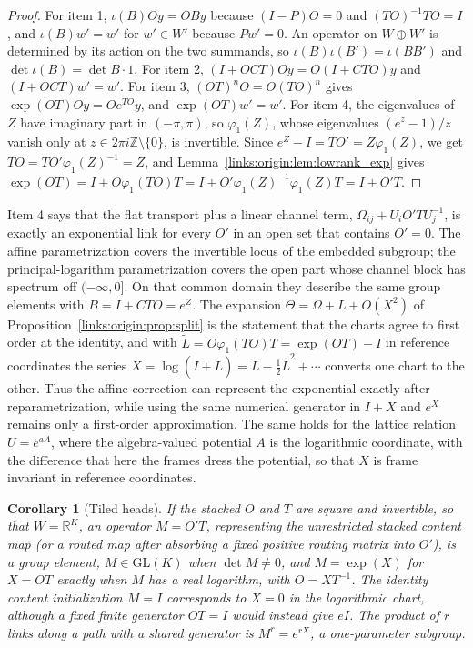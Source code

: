 \documentclass[11pt]{article}
\newtheorem{corollary}[theorem]{Corollary}
\theoremstyle{definition}
\theoremstyle{remark}
\providecommand{\GL}{\mathrm{GL}}
\begin{document}
\begin{proof}
For item 1, $\iota(B)Oy=OBy$ because $(I-P)O=0$ and $(TO)^{-1}TO=I$, and $\iota(B)w'=w'$ for $w'\in W'$ because $Pw'=0$. An operator on $W\oplus W'$ is determined by its action on the two summands, so $\iota(B)\iota(B')=\iota(BB')$ and $\det\iota(B)=\det B\cdot1$. For item 2, $(I+OCT)Oy=O(I+CTO)y$ and $(I+OCT)w'=w'$. For item 3, $(OT)^nO=O(TO)^n$ gives $\exp(OT)Oy=Oe^{TO}y$, and $\exp(OT)w'=w'$. For item 4, the eigenvalues of $Z$ have imaginary part in $(-\pi,\pi)$, so $\varphi_1(Z)$, whose eigenvalues $(e^z-1)/z$ vanish only at $z\in2\pi i\mathbb Z\setminus\{0\}$, is invertible. Since $e^Z-I=TO'=Z\varphi_1(Z)$, we get $TO=TO'\varphi_1(Z)^{-1}=Z$, and Lemma~\ref{links:origin:lem:lowrank_exp} gives $\exp(OT)=I+O\varphi_1(TO)T=I+O'\varphi_1(Z)^{-1}\varphi_1(Z)T=I+O'T$.
\end{proof}

Item 4 says that the flat transport plus a linear channel term, $\Omega_{ij}+U_iO'TU_j^{-1}$, is exactly an exponential link for every $O'$ in an open set that contains $O'=0$. The affine parametrization covers the invertible locus of the embedded subgroup; the principal-logarithm parametrization covers the open part whose channel block has spectrum off $(-\infty,0]$. On that common domain they describe the same group elements with $B=I+C TO=e^Z$. The expansion $\Theta=\Omega+L+O(X^2)$ of Proposition~\ref{links:origin:prop:split} is the statement that the charts agree to first order at the identity, and with $\widetilde L=O\varphi_1(TO)T=\exp(OT)-I$ in reference coordinates the series $X=\log(I+\widetilde L)=\widetilde L-\tfrac12\widetilde L^2+\cdots$ converts one chart to the other. Thus the affine correction can represent the exponential exactly after reparametrization, while using the same numerical generator in $I+X$ and $e^X$ remains only a first-order approximation. The same holds for the lattice relation $U=e^{aA}$, where the algebra-valued potential $A$ is the logarithmic coordinate, with the difference that here the frames dress the potential, so that $X$ is frame invariant in reference coordinates.

\begin{corollary}[Tiled heads]
\label{links:origin:cor:tiled_chart}
If the stacked $O$ and $T$ are square and invertible, so that $W=\mathbb R^K$, an operator $M=O'T$, representing the unrestricted stacked content map (or a routed map after absorbing a fixed positive routing matrix into $O'$), is a group element, $M\in\GL(K)$ when $\det M\ne0$, and $M=\exp(X)$ for $X=OT$ exactly when $M$ has a real logarithm, with $O=XT^{-1}$. The identity content initialization $M=I$ corresponds to $X=0$ in the logarithmic chart, although a fixed finite generator $OT=I$ would instead give $eI$. The product of $r$ links along a path with a shared generator is $M^r=e^{rX}$, a one-parameter subgroup.
\end{corollary}
\end{document}
